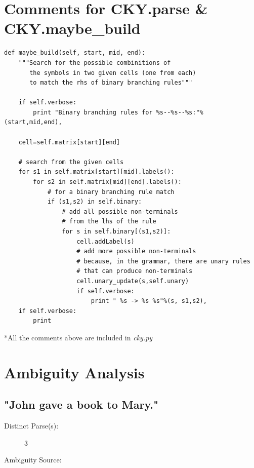 \documentclass{article}
\begin{document}
\section{Comments for CKY.parse \& CKY.maybe\_build}
\begin{lstlisting}
def maybe_build(self, start, mid, end):
	"""Search for the possible combinitions of 
	   the symbols in two given cells (one from each) 
	   to match the rhs of binary branching rules"""
	   
	if self.verbose:
		print "Binary branching rules for %s--%s--%s:"%(start,mid,end),
	
	cell=self.matrix[start][end]
	
	# search from the given cells
	for s1 in self.matrix[start][mid].labels():
		for s2 in self.matrix[mid][end].labels():
			# for a binary branching rule match
			if (s1,s2) in self.binary:
				# add all possible non-terminals
				# from the lhs of the rule
				for s in self.binary[(s1,s2)]:
					cell.addLabel(s)
					# add more possible non-terminals 
					# because, in the grammar, there are unary rules 
					# that can produce non-terminals
					cell.unary_update(s,self.unary)
					if self.verbose:
						print " %s -> %s %s"%(s, s1,s2),
	if self.verbose:
		print 

\end{lstlisting}
\hfill \break

*All the comments above are included in \textit{cky.py}

\hfill \break


\section{Ambiguity Analysis}

\subsection{"John gave a book to Mary."}

\begin{description}
	\item[Distinct Parse(s):]
	3
	\item[Ambiguity Source:]
	
\end{description}
\end{document}
